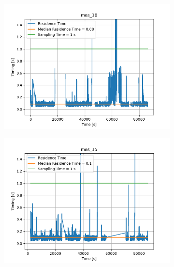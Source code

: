 \begin{figure}[H]
    \begin{minipage}{0.49\textwidth}
        \begin{figure}[H]
            \includegraphics[width=\textwidth]{figs/res_time/mes_18_timing_stuff.png}
        \end{figure}
    \end{minipage}
    \begin{minipage}{0.49\textwidth}
        \begin{figure}[H]
            \includegraphics[width=\textwidth]{figs/res_time/mes_15_timing_stuff.png}
        \end{figure}
    \end{minipage}
\end{figure}
